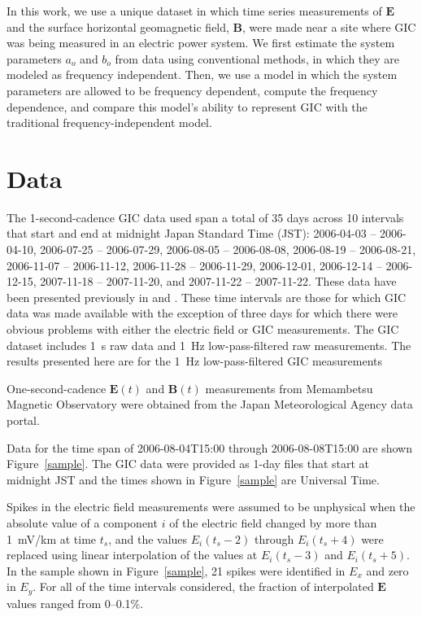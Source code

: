 \documentclass[draft,linenumbers]{agujournal2018}
\begin{document}
In this work, we use a unique dataset in which time series measurements of $\mathbf{E}$ and the surface horizontal geomagnetic field, $\mathbf{B}$, were made near a site where GIC was being measured in an electric power system.  We first estimate the system parameters $a_o$ and $b_o$ from data using conventional methods, in which they are modeled as frequency independent. Then, we use a model in which the system parameters are allowed to be frequency dependent, compute the frequency dependence, and compare this model's ability to represent GIC with the traditional frequency-independent model. 

\section{Data}

The 1-second-cadence GIC data used span a total of 35 days across 10 intervals that start and end at midnight Japan Standard Time (JST): 2006-04-03 -- 2006-04-10, 2006-07-25 -- 2006-07-29, 2006-08-05 -- 2006-08-08, 2006-08-19 -- 2006-08-21, 2006-11-07 -- 2006-11-12, 2006-11-28 -- 2006-11-29, 2006-12-01, 2006-12-14 -- 2006-12-15, 2007-11-18 -- 2007-11-20, and 2007-11-22 -- 2007-11-22. These data have been presented previously in \citet{Watari2009} and \cite{Watari2015}. These time intervals are those for which GIC data was made available with the exception of three days for which there were obvious problems with either the electric field or GIC measurements. The GIC dataset includes 1~s raw data and 1~Hz low-pass-filtered raw measurements. The results presented here are for the 1~Hz low-pass-filtered GIC measurements

One-second-cadence $\mathbf{E}(t)$ and $\mathbf{B}(t)$ measurements from Memambetsu Magnetic Observatory were obtained from the Japan Meteorological Agency data portal.

Data for the time span of 2006-08-04T15:00 through 2006-08-08T15:00 are shown Figure~\ref{sample}. The GIC data were provided as 1-day files that start at midnight JST and the times shown in Figure~\ref{sample} are Universal Time.

Spikes in the electric field measurements were assumed to be unphysical when the absolute value of a component $i$ of the electric field changed by more than 1~mV/km at time $t_s$, and the values $E_i(t_s-2)$ through $E_i(t_s+4)$ were replaced using linear interpolation of the values at $E_i(t_s-3)$ and $E_i(t_s + 5)$. In the sample shown in Figure~\ref{sample}, 21 spikes were identified in $E_x$ and zero in $E_y$. For all of the time intervals considered, the fraction of interpolated $\mathbf{E}$ values ranged from 0--0.1\%.
\end{document}
